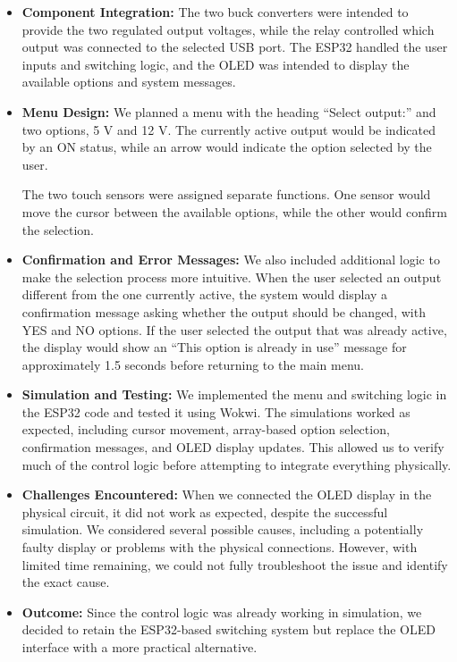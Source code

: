 \documentclass[12pt,a4paper]{article}
\numberwithin{figure}{section}
\begin{document}
\begin{itemize}
    \item \textbf{Component Integration:} The two buck converters were intended to provide the two regulated output voltages, while the relay controlled which output was connected to the selected USB port. The ESP32 handled the user inputs and switching logic, and the OLED was intended to display the available options and system messages.

    \item \textbf{Menu Design:} We planned a menu with the heading ``Select output:'' and two options, 5 V and 12 V. The currently active output would be indicated by an ON status, while an arrow would indicate the option selected by the user.

    The two touch sensors were assigned separate functions. One sensor would move the cursor between the available options, while the other would confirm the selection.

    \item \textbf{Confirmation and Error Messages:} We also included additional logic to make the selection process more intuitive. When the user selected an output different from the one currently active, the system would display a confirmation message asking whether the output should be changed, with YES and NO options. If the user selected the output that was already active, the display would show an ``This option is already in use'' message for approximately 1.5 seconds before returning to the main menu.

    \item \textbf{Simulation and Testing:} We implemented the menu and switching logic in the ESP32 code and tested it using Wokwi. The simulations worked as expected, including cursor movement, array-based option selection, confirmation messages, and OLED display updates. This allowed us to verify much of the control logic before attempting to integrate everything physically.

    \item \textbf{Challenges Encountered:} When we connected the OLED display in the physical circuit, it did not work as expected, despite the successful simulation. We considered several possible causes, including a potentially faulty display or problems with the physical connections. However, with limited time remaining, we could not fully troubleshoot the issue and identify the exact cause.

    \item \textbf{Outcome:} Since the control logic was already working in simulation, we decided to retain the ESP32-based switching system but replace the OLED interface with a more practical alternative.
\end{itemize}
\end{document}
